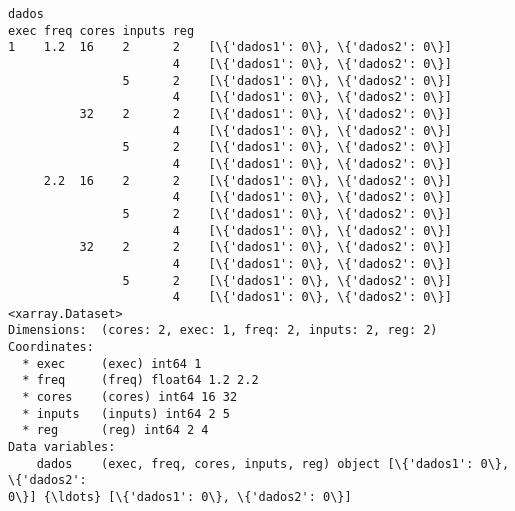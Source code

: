 \documentclass[11pt]{article}
\begin{document}
    \begin{Verbatim}[commandchars=\\\{\}]
                                                     dados
exec freq cores inputs reg
1    1.2  16    2      2    [\{'dados1': 0\}, \{'dados2': 0\}]
                       4    [\{'dados1': 0\}, \{'dados2': 0\}]
                5      2    [\{'dados1': 0\}, \{'dados2': 0\}]
                       4    [\{'dados1': 0\}, \{'dados2': 0\}]
          32    2      2    [\{'dados1': 0\}, \{'dados2': 0\}]
                       4    [\{'dados1': 0\}, \{'dados2': 0\}]
                5      2    [\{'dados1': 0\}, \{'dados2': 0\}]
                       4    [\{'dados1': 0\}, \{'dados2': 0\}]
     2.2  16    2      2    [\{'dados1': 0\}, \{'dados2': 0\}]
                       4    [\{'dados1': 0\}, \{'dados2': 0\}]
                5      2    [\{'dados1': 0\}, \{'dados2': 0\}]
                       4    [\{'dados1': 0\}, \{'dados2': 0\}]
          32    2      2    [\{'dados1': 0\}, \{'dados2': 0\}]
                       4    [\{'dados1': 0\}, \{'dados2': 0\}]
                5      2    [\{'dados1': 0\}, \{'dados2': 0\}]
                       4    [\{'dados1': 0\}, \{'dados2': 0\}]
<xarray.Dataset>
Dimensions:  (cores: 2, exec: 1, freq: 2, inputs: 2, reg: 2)
Coordinates:
  * exec     (exec) int64 1
  * freq     (freq) float64 1.2 2.2
  * cores    (cores) int64 16 32
  * inputs   (inputs) int64 2 5
  * reg      (reg) int64 2 4
Data variables:
    dados    (exec, freq, cores, inputs, reg) object [\{'dados1': 0\}, \{'dados2':
0\}] {\ldots} [\{'dados1': 0\}, \{'dados2': 0\}]
    \end{Verbatim}
\end{document}
